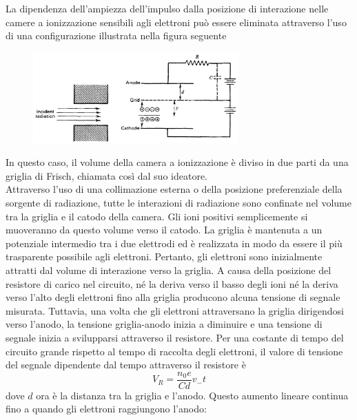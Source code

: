 \begin{approfondimento}
   \footnotesize
   La dipendenza dell'ampiezza dell'impulso dalla posizione di interazione nelle camere a ionizzazione sensibili agli elettroni può essere eliminata attraverso l'uso di una configurazione illustrata nella figura seguente
   \begin{figure}[H]
      \centering
      \includegraphics[width=0.7\textwidth]{immagini/griglia_di_frisch_1.png}
   \end{figure}
   In questo caso, il volume della camera a ionizzazione è diviso in due parti da una griglia di Frisch, chiamata così dal suo ideatore.\\
   Attraverso l'uso di una collimazione esterna o della posizione preferenziale della sorgente di radiazione, tutte le interazioni di radiazione sono confinate nel volume tra la griglia e il catodo della camera. Gli ioni positivi semplicemente si muoveranno da questo volume verso il catodo. La griglia è mantenuta a un potenziale intermedio tra i due elettrodi ed è realizzata in modo da essere il più trasparente possibile agli elettroni. Pertanto, gli elettroni sono inizialmente attratti dal volume di interazione verso la griglia. A causa della posizione del resistore di carico nel circuito, né la deriva verso il basso degli ioni né la deriva verso l'alto degli elettroni fino alla griglia producono alcuna tensione di segnale misurata. Tuttavia, una volta che gli elettroni attraversano la griglia dirigendosi verso l'anodo, la tensione griglia-anodo inizia a diminuire e una tensione di segnale inizia a svilupparsi attraverso il resistore. Per una costante di tempo del circuito grande rispetto al tempo di raccolta degli elettroni, il valore di tensione del segnale dipendente dal tempo attraverso il resistore è
   \begin{equation*}
      V_R=\frac{n_0 e}{Cd} v_{-} t
   \end{equation*}
   dove $d$ ora è la distanza tra la griglia e l'anodo. Questo aumento lineare continua fino a quando gli elettroni raggiungono l'anodo:
   \begin{figure}[H]

\end{figure}
\end{approfondimento}
